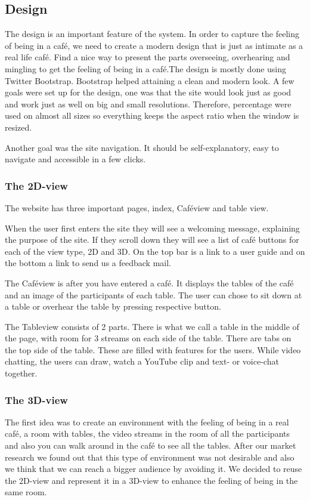 \documentclass[12pt, titlepage]{article}
\begin{document}
\subsection{Design}
The design is an important feature of the system. In order to capture the feeling of being in a café, we need to create a modern design that is just as intimate as a real life café. Find a nice way to present the parts overseeing, overhearing and mingling to get the feeling of being in a café.The design is mostly done using Twitter Bootstrap. Bootstrap helped attaining a clean and modern look. A few goals were set up for the design, one was that the site would look just as good and work just as well on big and small resolutions. Therefore, percentage were used on almost all sizes so everything keeps the aspect ratio when the window is resized.

Another goal was the site navigation. It should be self-explanatory, easy to navigate and accessible in a few clicks.
\subsubsection{The 2D-view}
The website has three important pages, index, Caféview and table view.

When the user first enters the site they will see a welcoming message, explaining the purpose of the site. If they scroll down they will see a list of café buttons for each of the view type, 2D and 3D. On the top bar is a link to a user guide and on the bottom a link to send us a feedback mail.

The Caféview is after you have entered a café. It displays the tables of the café and an image of the participants of each table. The user can chose to sit down at a table or overhear the table by pressing respective button.

The Tableview consists of 2 parts. There is what we call a table in the middle of the page, with room for 3 streams on each side of the table. There are tabs on the top side of the table. These are filled with features for the users. While video chatting, the users can draw, watch a YouTube clip and text- or voice-chat together. 
\subsubsection{The 3D-view}
The first idea was to create an environment with the feeling of being in a real café, a room with tables, the video streams in the room of all the participants and also you can walk around in the café to see all the tables. After our market research we found out that this type of environment was not desirable and also we think that we can reach a bigger audience by avoiding it. We decided to reuse the 2D-view and represent it in a 3D-view to enhance the feeling of being in the same room. 
\end{document}

